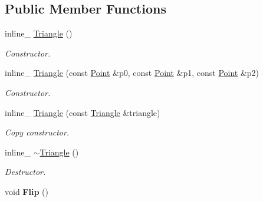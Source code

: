 \subsection*{Public Member Functions}
\begin{DoxyCompactItemize}
\item 
inline\+\_\+ \hyperlink{classTriangle_ac80e3c2a3d219c8aa81d99af89cae0f9}{Triangle} ()\hypertarget{classTriangle_ac80e3c2a3d219c8aa81d99af89cae0f9}{}\label{classTriangle_ac80e3c2a3d219c8aa81d99af89cae0f9}

\begin{DoxyCompactList}\small\item\em Constructor. \end{DoxyCompactList}\item 
inline\+\_\+ \hyperlink{classTriangle_a1acf1a7a9de668ddf66fc1661ad8cd14}{Triangle} (const \hyperlink{classPoint}{Point} \&p0, const \hyperlink{classPoint}{Point} \&p1, const \hyperlink{classPoint}{Point} \&p2)\hypertarget{classTriangle_a1acf1a7a9de668ddf66fc1661ad8cd14}{}\label{classTriangle_a1acf1a7a9de668ddf66fc1661ad8cd14}

\begin{DoxyCompactList}\small\item\em Constructor. \end{DoxyCompactList}\item 
inline\+\_\+ \hyperlink{classTriangle_a6b07d7c9cfafa6a3422e4f55dd9e28dc}{Triangle} (const \hyperlink{classTriangle}{Triangle} \&triangle)\hypertarget{classTriangle_a6b07d7c9cfafa6a3422e4f55dd9e28dc}{}\label{classTriangle_a6b07d7c9cfafa6a3422e4f55dd9e28dc}

\begin{DoxyCompactList}\small\item\em Copy constructor. \end{DoxyCompactList}\item 
inline\+\_\+ \hyperlink{classTriangle_ab6a7b5183019a7282955c0c57f1ea98e}{$\sim$\+Triangle} ()\hypertarget{classTriangle_ab6a7b5183019a7282955c0c57f1ea98e}{}\label{classTriangle_ab6a7b5183019a7282955c0c57f1ea98e}

\begin{DoxyCompactList}\small\item\em Destructor. \end{DoxyCompactList}\item 
void {\bfseries Flip} ()\hypertarget{classTriangle_a474ba7649c0a8fb7013892e7205911c9}{}\label{classTriangle_a474ba7649c0a8fb7013892e7205911c9}


\end{DoxyCompactItemize}
